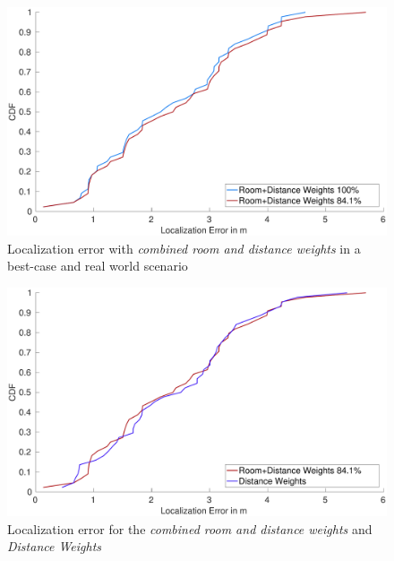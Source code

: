 \begin{figure}[bh]
\centering
\includegraphics[width=\textwidth]{Figures/WeightingCDF_realRW}
\decoRule
\caption[CDF Room+Distance Weights - best-case/real world comparison]{Localization error with \emph{combined room and distance weights} in a best-case and real world scenario}
\label{fig:WeightingCDFrealRoom}
\end{figure}

\begin{figure}
\centering
\includegraphics[width=\textwidth]{Figures/WeightingCDF_realDistance}
\decoRule
\caption[CDF Room+Distance Weights - comparison against Distance Weights]{Localization error for the \emph{combined room and distance weights} and \emph{Distance Weights}}
\label{fig:WeightingCDFrealDistance}
\end{figure}
